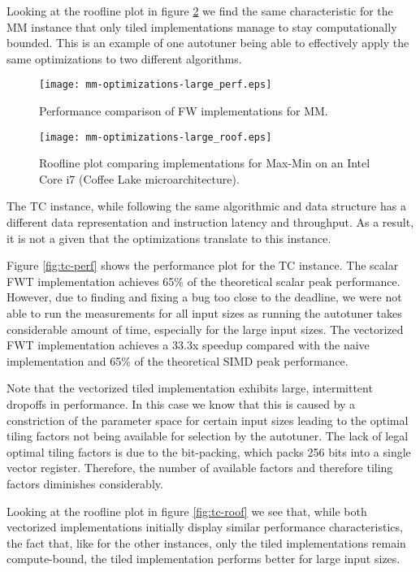 Looking at the roofline plot in figure \ref{fig:mm-roof} we find the same characteristic for the MM instance that only tiled
implementations manage to stay computationally bounded. This is an example of one autotuner being able to effectively
apply the same optimizations to two different algorithms.
\begin{figure}[h]
    \centering
    \texttt{[image: mm-optimizations-large\_perf.eps]}
    \caption{Performance comparison of FW implementations for MM.}
    \label{fig:mm-perf}
\end{figure}
\begin{figure}[h]
    \centering
    \texttt{[image: mm-optimizations-large\_roof.eps]}
    \caption{Roofline plot comparing implementations for Max-Min on an Intel Core i7 (Coffee Lake microarchitecture).}
    \label{fig:mm-roof}
\end{figure}

The TC instance, while following the same algorithmic and data structure has a different data representation and instruction
latency and throughput. As a result, it is not a given that the optimizations translate to this instance.

Figure \ref{fig:tc-perf} shows the performance plot for the TC instance. The scalar FWT implementation achieves 65\% of the
theoretical scalar peak performance. However, due to finding and fixing a bug too close to the deadline, we were not able to run the measurements
for all input sizes as running the autotuner takes considerable amount of time, especially for the large input sizes. The
vectorized FWT implementation achieves a 33.3x speedup compared with the naive implementation and 65\% of the theoretical
SIMD peak performance.

Note that the vectorized tiled implementation exhibits large, intermittent dropoffs in performance. In this case we know that this
is caused by a constriction of the parameter space for certain input sizes leading to the optimal tiling factors not being available
for selection by the autotuner. The lack of legal optimal tiling factors is due to the bit-packing, which packs 256 bits into a
single vector register. Therefore, the number of available factors and therefore tiling factors diminishes considerably.

Looking at the roofline plot in figure \ref{fig:tc-roof} we see that, while both vectorized implementations initially display 
similar performance characteristics, the fact that,  like for the other instances, only the tiled implementations remain
compute-bound, the tiled implementation performs better for large input sizes.

